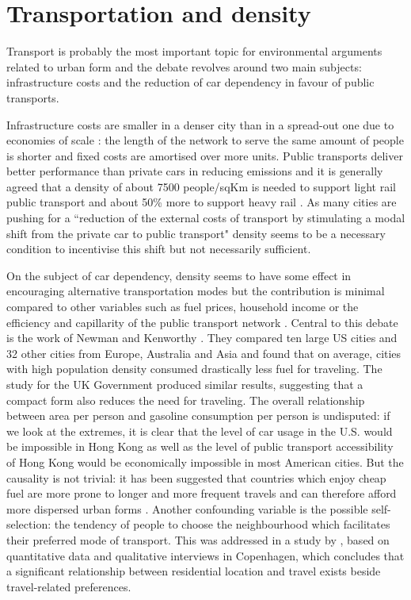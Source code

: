 \documentclass [a4paper,12pt]{article} %
\begin{document}
\section*{Transportation and density}

Transport is probably the most important topic for environmental arguments related to urban form and the debate revolves around two main subjects: infrastructure costs and the reduction of car dependency in favour of public transports. 

Infrastructure costs are smaller in a denser city than in a spread-out one due to economies of scale \citep{priest1977large, frank1989costs, burchell1995land}: the length of the network to serve the same amount of people is shorter and fixed costs are amortised over more units. Public transports deliver better performance than private cars in reducing  emissions \citep{CENTRO2012} and it is generally agreed that a density of about 7500 people/sqKm is needed to support light rail public transport and about 50\% more to support heavy rail \citep{cervero2011urban}. As many cities are pushing for a ``reduction of the external costs of transport by stimulating a modal shift from the private car to public transport" \citep{Nijkamp1996} density seems to be a necessary condition to incentivise this shift but not necessarily sufficient.

On the subject of car dependency, density seems to have some effect in encouraging alternative transportation modes but the contribution is minimal compared to other variables such as fuel prices, household income or the efficiency and capillarity of the public transport network \citep{litman2005land}. Central to this debate is the work of Newman and Kenworthy \citep{newman1992compact, newman1989cities, newman1989gasoline}. They compared ten large US cities and 32 other cities from Europe, Australia and Asia and found that on average, cities with high population density consumed drastically less fuel for traveling. The \cite{ecotec1993reducing} study for the UK Government produced similar results, suggesting that a compact form also reduces the need for traveling. The overall relationship between area per person and gasoline consumption per person is undisputed: if we look at the extremes, it is clear that the level of car usage in the U.S. would be impossible in Hong Kong as well as the level of public transport accessibility of Hong Kong would be economically impossible in most American cities. But the causality is not trivial: it has been suggested that countries which enjoy cheap fuel are more prone to longer and more frequent travels and can therefore afford more dispersed urban forms \citep{gordon1997densities}. Another confounding variable is the possible self-selection: the tendency of people to choose the neighbourhood which facilitates their preferred mode of transport. This was addressed in a study by \cite{naess2009residential}, based on quantitative data and qualitative interviews in Copenhagen, which concludes that a significant relationship between residential location and travel exists beside travel-related preferences. 
\end{document}
